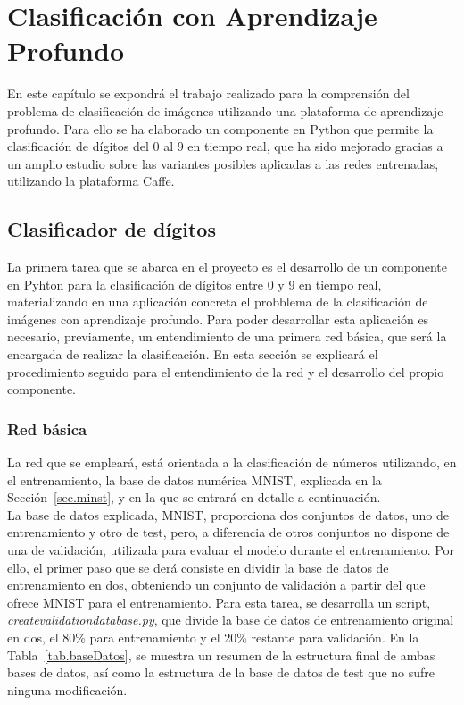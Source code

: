 \chapter{Clasificación con Aprendizaje Profundo}\label{cap.clasificacion}
En este capítulo se expondrá el trabajo realizado para la comprensión del problema de clasificación de imágenes utilizando una plataforma de aprendizaje profundo. Para ello se ha elaborado un componente en Python que permite la clasificación de dígitos del 0 al 9 en tiempo real, que ha sido mejorado gracias a un amplio estudio sobre las variantes posibles aplicadas a las redes entrenadas, utilizando la plataforma Caffe.\\

\section{Clasificador de dígitos}
La primera tarea que se abarca en el proyecto es el desarrollo de un componente en Pyhton para la clasificación de dígitos entre 0 y 9 en tiempo real, materializando en una aplicación concreta el probblema de la clasificación de imágenes con aprendizaje profundo. Para poder desarrollar esta aplicación es necesario, previamente, un entendimiento de una primera red básica, que será la encargada de realizar la clasificación. En esta sección se explicará el procedimiento seguido para el entendimiento de la red y el desarrollo del propio componente.\\

\subsection{Red básica}\label{sec.red}
La red que se empleará, está orientada a la clasificación de números utilizando, en el entrenamiento, la base de datos numérica MNIST, explicada en la Sección~\ref{sec.minst}, y en la que se entrará en detalle a continuación.\\

La base de datos explicada, MNIST, proporciona dos conjuntos de datos, uno de entrenamiento y otro de test, pero, a diferencia de otros conjuntos no dispone de una de validación, utilizada para evaluar el modelo durante el entrenamiento. Por ello, el primer paso que se derá consiste en dividir la base de datos de entrenamiento en dos, obteniendo un conjunto de validación a partir del que ofrece MNIST para el entrenamiento. Para esta tarea, se desarrolla un script, \textit{createvalidationdatabase.py}, que divide la base de datos de entrenamiento original en dos, el 80\% para entrenamiento y el 20\% restante para validación. En la Tabla~\ref{tab.baseDatos}, se muestra un resumen de la estructura final de ambas bases de datos, así como la estructura de la base de datos de test que no sufre ninguna modificación.\\

